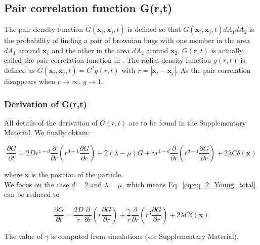 \subsection*{Pair correlation function G(r,t)}

The pair density function $G(\boldsymbol{x}_i,\boldsymbol{x}_j,t)$ is defined so that $G(\boldsymbol{x}_i,\boldsymbol{x}_j,t)dA_1dA_2$ is the probability of finding a pair of brownian bugs with one member in the area $dA_1$ around $\boldsymbol{x}_1$ and the other in the area $dA_2$ around $\boldsymbol{x}_2$. $G(\boldsymbol{r},t)$ is actually called the pair correlation function in \cite{young_reproductive_2001}. The radial density function $g(r,t)$ is defined as $G(\boldsymbol{x}_i,\boldsymbol{x}_j,t)=C^2g(r,t)$ with $r=|\boldsymbol{x}_i-\boldsymbol{x}_j|$. As the pair correlation disappears when $r\rightarrow\infty$, $g\rightarrow 1$. \\

\subsubsection*{Derivation of G(r,t)}

All details of the derivation of $G(r,t)$ are to be found in the Supplementary Material. We finally obtain:

\begin{equation}
\frac{\partial G}{\partial t}=2Dr^{1-d}\frac{\partial}{\partial r}\left(r^{d-1}\frac{\partial G}{\partial r}\right)+2(\lambda-\mu)G+\gamma r^{1-d}\frac{\partial}{\partial r}\left(r^{d+1}\frac{\partial G}{\partial r}\right)+2\lambda C\delta(\boldsymbol{x})\label{eq:eq_2_Young_total}
\end{equation}

where $\boldsymbol{x}$ is the position of the particle. \\

We focus on the case $d=2$ and $\lambda=\mu$, which means Eq.~\ref{eq:eq_2_Young_total} can be reduced to

\begin{equation}
\frac{\partial G}{\partial t}=\frac{2D}{r}\frac{\partial}{\partial r}\left(r\frac{\partial G}{\partial r}\right)+\frac{\gamma}{r}\frac{\partial}{\partial r}\left(r^{3}\frac{\partial G}{\partial r}\right)+2\lambda C\delta(\boldsymbol{x})\label{eq:eq_2_Young_reduced}
\end{equation}

The value of $\gamma$ is computed from simulations (see Supplementary Material).

